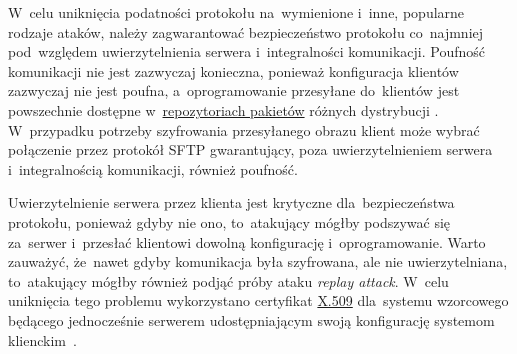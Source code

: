 \documentclass[thesis]{subfiles}
\begin{document}

W~celu uniknięcia podatności protokołu na~wymienione i~inne, popularne rodzaje ataków, należy zagwarantować bezpieczeństwo protokołu co~najmniej pod~względem uwierzytelnienia serwera i~integralności komunikacji. Poufność komunikacji nie jest zazwyczaj konieczna, ponieważ konfiguracja klientów zazwyczaj nie jest poufna, a~oprogramowanie przesyłane do~klientów jest powszechnie dostępne w~\href{https://wiki.archlinux.org/index.php/official_repositories}{repozytoriach pakietów} różnych dystrybucji . W~przypadku potrzeby szyfrowania przesyłanego obrazu klient może wybrać połączenie przez protokół SFTP gwarantujący, poza uwierzytelnieniem serwera i~integralnością komunikacji, również poufność.

Uwierzytelnienie serwera przez klienta jest krytyczne dla~bezpieczeństwa protokołu, ponieważ gdyby nie ono, to~atakujący mógłby podszywać się za~serwer i~przesłać klientowi dowolną konfigurację i~oprogramowanie. Warto zauważyć, że~nawet gdyby komunikacja była szyfrowana, ale nie uwierzytelniana, to~atakujący mógłby również podjąć próby ataku \emph{replay attack}. W~celu uniknięcia tego problemu wykorzystano certyfikat \href{https://en.wikipedia.org/wiki/X.509}{X.509} dla~systemu wzorcowego będącego jednocześnie serwerem udostępniającym swoją konfigurację systemom klienckim~\cite{wiki:x509}.
\end{document}
